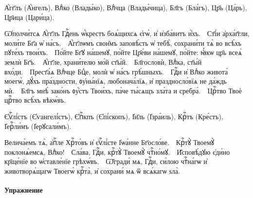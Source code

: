 \documentclass[11pt,a4paper,oneside]{memoir}
\begin{document}
    \begin{slv}
        А҆́гг҃лъ (А҆́нгелъ), Влⷣко (Влады́ко), Влⷣчца (Влады́чица), Бл҃гъ (Бла́гъ), Цр҃ь (Ца́рь), Цр҃ица (Цари́ца).
        
        Ѡ҆полчи́тсѧ А҆́гг҃лъ Гдⷭ҇ень ѡ҆́крестъ боѧ́щихсѧ є҆гѡ̀, и҆ и҆зба́витъ и҆̀хъ.~\textemdash~Ст҃і́и а҆рха́г҃гли, моли́те Бг҃а ѡ҆ на́съ.~\textemdash~А҆́гг҃лѡмъ свои̑мъ заповѣ́сть ѡ҆ тебѣ̀, сохрани́ти тѧ̀ во всѣ́хъ пꙋте́хъ твои́хъ.~\textemdash~По́йте Бг҃ꙋ на́шемꙋ, по́йте Цр҃е́ви на́шемꙋ, по́йте: ꙗ҆́кѡ цр҃ь всеѧ̀ землѝ Бг҃ъ.~\textemdash~А҆́гг҃ле, храни́телю мо́й ст҃ы́й.~\textemdash~Бл҃гословѝ, Влⷣка, ст҃ы́й вхо́ди.~\textemdash~Прест҃а́ѧ Влⷣчце Бцⷣе, молѝ ѡ҆ на́съ грѣ́шныхъ.~\textemdash~Гдⷭ҇и и҆ Влⷣко живота́ моегѡ̀, дꙋ́хъ пра́здности, ᲂу҆ны́нїѧ, любонача́лїѧ, и҆ праздносло́вїѧ не да́ждь мѝ.~\textemdash~Бл҃гъ мнѣ̀ зако́нъ ᲂу҆́стъ Твои́хъ, па́че ты́сѧщъ зла́та и сребра̀.~\textemdash~Црⷭ҇тво Твоѐ црⷭ҇тво всѣ́хъ вѣкѡ́въ.
        
        Є҆ѵⷢ҇лі́стъ (Є҆ѵангелі́стъ), Є҆пⷭ҇кпъ (Є҆пі́скопъ), І҆и҃ль (І҆зра́иль), Крⷭ҇тъ (Кре́стъ), І҆ерⷭ҇ли́мъ (І҆ерꙋсали́мъ).
        
        Велича́емъ тѧ̀, а҆пⷭ҇ле Хрⷭ҇то́въ и҆ є҆ѵⷢ҇лі́сте І҆ѡа́нне Бг҃осло́ве.~\textemdash~Крⷭ҇тꙋ̀ Твоемꙋ̀ поклонѧ́емсѧ, Влⷣко!~\textemdash~Сла́ва, Гдⷭ҇и, крⷭ҇тꙋ̀ Твоемꙋ̀ чтⷭ҇но́мꙋ.~\textemdash~И̑сповѣ́дꙋю є҆ди́но кр҃ще́нїе во ѡ҆ставле́нїе грѣхѡ́въ.~\textemdash~Ѡ̑гради́ мѧ, Гдⷭ҇и, си́лою чтⷭ҇на́гѡ и҆ животворѧ́щагѡ Твоегѡ̀ крⷭ҇та̀, и҆ сохрани́ мѧ ѿ всѧ́кагѡ ѕла̀.
    \end{slv}
    \medskip

                    \paragraph{Упражнение}
\end{document}
